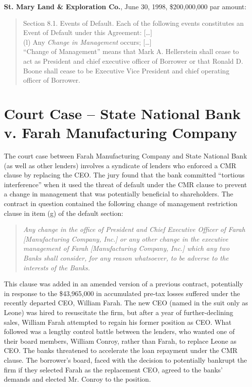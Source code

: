 \documentclass[12pt]{article}
\begin{document}
\begin{appendices}
\noindent
\textbf{St. Mary Land \& Exploration Co.}, June 30, 1998, \$200,000,000 par amount:
\begin{quote}
\singlespacing \vspace{-8pt}
Section 8.1. Events of Default. Each of the following events constitutes an Event of Default under this Agreement:  [\dots]\\
(l) Any \textit{Change in Management} occurs;  [\dots]\\
``Change of Management'' means that Mark A. Hellerstein shall cease to act as President and chief executive officer of Borrower or that Ronald D. Boone shall cease to be Executive Vice President and chief operating officer of Borrower.
\end{quote}








\section{Court Case -- State National Bank v. Farah Manufacturing Company}
 \label{IApp:court_case}

The court case between Farah Manufacturing Company and State National Bank (as well as other lenders) involves a syndicate of lenders who enforced a CMR clause by replacing the CEO.
The jury found that the bank committed ``tortious interference'' when it used the threat of default under the CMR clause to prevent a change in management that was potentially beneficial to shareholders.
The contract in question contained the following change of management restriction clause in item (g) of the default section:

\begin{quote}
    \singlespacing
   \textit{
    Any change in the office of President and Chief Executive Officer of Farah [Manufacturing Company, Inc.] or any other change in the executive management of Farah [Manufacturing Company, Inc.] which any two Banks shall consider, for any reason whatsoever, to be adverse to the interests of the Banks.
   }
\end{quote}

This clause was added in an amended version of a previous contract, potentially in response to the \$43,965,000 in accumulated pre-tax losses suffered under the recently departed CEO, William Farah.
The new CEO (named in the suit only as Leone) was hired to resuscitate the firm, but after a year of further-declining sales, William Farah attempted to regain his former position as CEO.
What followed was a lengthy control battle between the lenders, who wanted one of their board members, William Conroy, rather than Farah, to replace Leone as CEO.
The banks threatened to accelerate the loan repayment under the CMR clause.
The borrower's board, faced with the decision to potentially bankrupt the firm if they selected Farah as the replacement CEO, agreed to the banks' demands and elected Mr. Conroy to the position.



\end{appendices}
\end{document}
